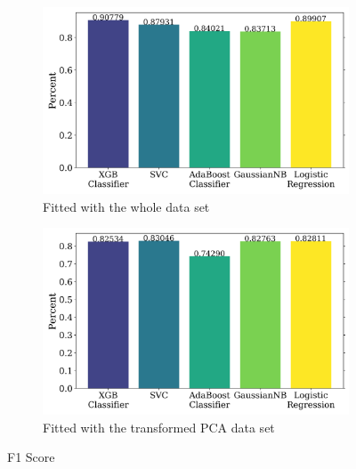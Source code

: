 \documentclass{article}
\begin{document}
\begin{figure}[H]
    \centering
    \begin{subfigure}[t]{0.495\textwidth}
        \centering
        \includegraphics[width=\textwidth]{supporting_images/fbeta_notpca.png}
        \caption{Fitted with the whole data set}
        \label{fig:fbeta_notpca}
    \end{subfigure}
    \hfill
    \begin{subfigure}[t]{0.495\textwidth}
        \centering
        \includegraphics[width=\textwidth]{supporting_images/fbeta_pca.png}
        \caption{Fitted with the transformed PCA data set}
        \label{fig:fbeta_pca}
    \end{subfigure}
    \caption{F1 Score}
    \label{fig:fbeta}
\end{figure}
\end{document}
